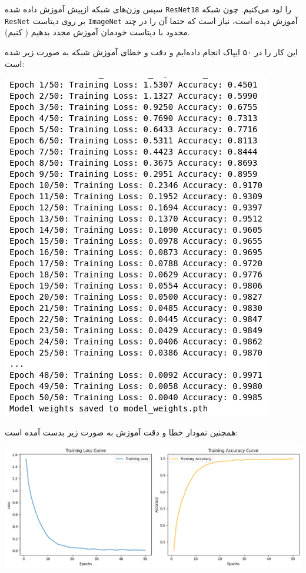\begin{qsolve}
سپس وزن‌های شبکه از‌پیش آموزش داده شده \texttt{ResNet18} را لود می‌کنیم. چون شبکه \texttt{ResNet} بر روی دیتاست \texttt{ImageNet} آموزش دیده است، نیاز است که حتما آن را در چند  محدود با دیتاست خودمان آموزش مجدد بدهیم ( کنیم).

این کار را در ۵۰ ایپاک انجام داده‌ایم و دقت و خطای آموزش شبکه به صورت زیر شده است:

\begin{center}
	\includegraphics*[width=0.5\linewidth]{pics/img5.png}
	\label{روند تغییر دقت و خطای آموزش}
\end{center}

همچنین نمودار خطا و دقت آموزش به صورت زیر بدست آمده است:

\begin{center}
	\includegraphics*[width=1\linewidth]{pics/img4.png}
	\label{نمودار خطا و دقت آموزش}
\end{center}
\end{qsolve}




